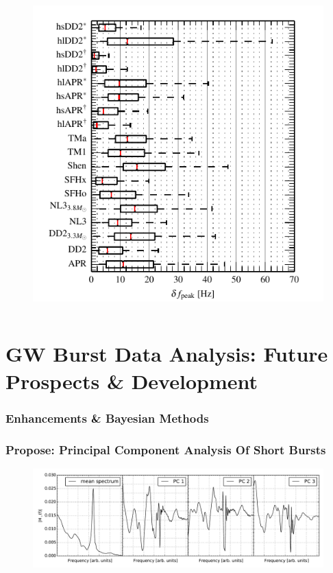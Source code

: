 \documentclass[serif,mathserif]{beamer}
\begin{document}
\begin{frame}
\begin{columns}[]
        \begin{center}
            \vspace{-0.5cm}
            \begin{figure}
                \includegraphics[width=\columnwidth]{figures/deltaFpeak.pdf}
            \end{figure}
        \end{center}

    \end{columns}

\end{frame}

\section{GW Burst Data Analysis: Future Prospects \& Development}

\begin{frame}
    \frametitle{Enhancements \& Bayesian Methods}
\end{frame}


\begin{frame}
    \frametitle{Propose: Principal Component Analysis Of Short Bursts}

    \begin{figure}
        \centering
        \includegraphics[width=\columnwidth]{figures/magnitude_pcs.pdf}
    \end{figure}

\end{frame}
\end{document}
